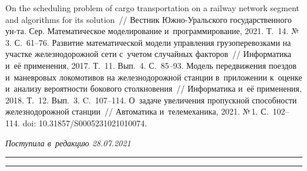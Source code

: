 \begin{multicols}{2}
{{\begin{thebibliography}{99}
 On the scheduling problem of cargo transportation on a railway network segment 
and algorithms for its solution~// Вестник Юж\-но-Ураль\-ско\-го государственного ун-та.
Сер. Математическое моделирование и~программирование, 2021. 
Т.~14. №\,3. С.~61--76.
 Развитие математической 
модели управления грузоперевозками на участке железнодорожной сети с~учетом случайных 
факторов~// Информатика и~её применения, 2017. Т.~11. Вып.~4. С.~85--93.
 Модель передвижения поездов и~маневровых 
локомотивов на 
 железнодорожной станции в~приложении к~оценке и~анализу вероятности 
бокового столкновения~// Информатика и~её применения, 2018. Т.~12. Вып.~3. C.~107--114.
 О~задаче увеличения пропускной спо\-соб\-ности железнодорожной станции~// 
 Автоматика и~телемеханика, 2021. %
 №\,1. С.~102--114. doi: 10.31857/S0005231021010074.


 \end{thebibliography}

}
}


\end{multicols}

\vspace*{-9pt}

\hfill{\small\textit{Поступила в~редакцию 28.07.2021}}

\vspace*{8pt}




\hrule

\vspace*{2pt}

\hrule

\vspace*{-2pt}

\def\tit{ALGORITHMS FOR AN APPROXIMATE SOLUTION OF~THE~TRACK POSSESSION 
PROBLEM ON~THE RAILWAY NETWORK SEGMENT}


\def\titkol{Algorithms for an approximate solution of~the~track possession 
problem on~the railway network segment}

\def\aut{A.\,V.~Bosov$^{1,2}$, A.\,N.~Ignatov$^2$, and~A.\,V.~Naumov$^2$}

\def\autkol{A.\,V.~Bosov, A.\,N.~Ignatov, and~A.\,V.~Naumov}


